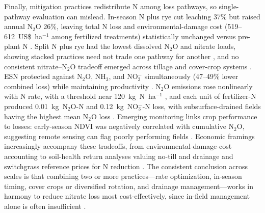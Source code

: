 \documentclass[11pt]{article}
\begin{document}
Finally, mitigation practices redistribute N among loss pathways, so single-pathway evaluation can mislead. In-season N plus rye cut leaching 37\% but raised annual N$_2$O 26\%, leaving total N loss and environmental-damage cost (519--612~US\$~ha$^{-1}$ among fertilized treatments) statistically unchanged versus pre-plant N \parencite{PrezaFontes2023}. Split N plus rye had the lowest dissolved N$_2$O and nitrate loads, showing stacked practices need not trade one pathway for another \parencite{Oliveira2025}, and no consistent nitrate--N$_2$O tradeoff emerged across tillage and cover-crop systems \parencite{OBrien2022}. ESN protected against N$_2$O, NH$_3$, and NO$_3^-$ simultaneously (47--49\% lower combined loss) while maintaining productivity \parencite{Menegaz2025}. N$_2$O emissions rose nonlinearly with N rate, with a threshold near 120~kg~N~ha$^{-1}$ \parencite{Wang2016b}, and each unit of fertilizer-N produced 0.01~kg~N$_2$O-N and 0.12~kg~NO$_3^-$-N loss, with subsurface-drained fields having the highest mean N$_2$O loss \parencite{Chatterjee2020b}. Emerging monitoring links crop performance to losses: early-season NDVI was negatively correlated with cumulative N$_2$O, suggesting remote sensing can flag poorly performing fields \parencite{Fontes2019}. Economic framings increasingly accompany these tradeoffs, from environmental-damage-cost accounting \parencite{PrezaFontes2023} to soil-health return analyses valuing no-till and drainage \parencite{Cassman2025} and switchgrass reference prices for N reduction \parencite{Woodbury2018}. The consistent conclusion across scales is that combining two or more practices---rate optimization, in-season timing, cover crops or diversified rotation, and drainage management---works in harmony to reduce nitrate loss most cost-effectively, since in-field management alone is often insufficient \parencite{Dinnes2002,Singh2023}.

\printbibliography
\end{document}
